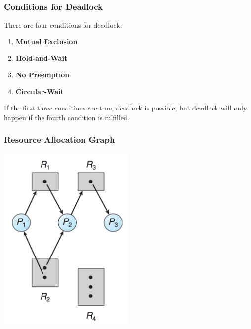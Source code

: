 \begin{frame}
\frametitle{Conditions for Deadlock}
There are four conditions for deadlock:

\begin{enumerate}
	\item \textbf{Mutual Exclusion}
	\item \textbf{Hold-and-Wait}
	\item \textbf{No Preemption}
	\item \textbf{Circular-Wait}
\end{enumerate}


If the first three conditions are true, deadlock is possible, but deadlock will only happen if the fourth condition is fulfilled. 


\end{frame}

\begin{frame}
\frametitle{Resource Allocation Graph}

\begin{center}
\includegraphics[width=0.50\textwidth]{images/rag1.png}
\end{center}

\end{frame}

